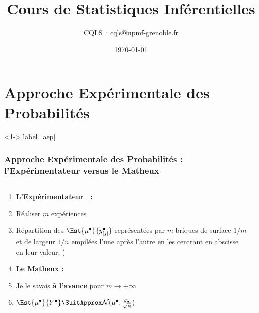 \documentclass[11pt]{beamer}
\title[Problématiques Produits A et B]
{Cours de Statistiques Inférentielles}
\author{CQLS~: cqls@upmf-grenoble.fr}
\date{\today}
\begin{document}
\maketitle


\section[A.E.P.]{Approche Expérimentale des Probabilités}

\begin{frame}<1->[label=aep]
\frametitle<1->{\textbf{A}pproche \textbf{E}xpérimentale des \textbf{P}robabilités : l'Expérimentateur versus le Matheux}
\begin{columns}
\begin{column}{5cm}
      \begin{enumerate}
     \item[] \textbf{L'Expérimentateur ~:} 
        \item<1-10| alert@1-4>
         Réaliser $m$ expériences
        \item<5-10| alert@5-8>
          Répartition des $\Est{\mu^\bullet}{y^\bullet_{[j]}}$ {\small représentées par $m$ briques de surface $1/m$ et de largeur $1/n$ empilées l'une après l'autre en les centrant en abscisse en leur valeur.}
          )
  \item<9-10>[] \textbf{Le Matheux :}      
  \item<9-10| alert@9>
          Je le savais \textbf{à l'avance} pour $m\to+\infty$
           \item<10| alert@10>
           $\Est{\mu^\bullet}{Y^\bullet}\SuitApprox \mathcal{N}(\mu^\bullet,\frac{\sigma_\bullet}{\sqrt{n}})$
      \end{enumerate}
     
\end{column}    
\begin{column}{6.5cm}








\end{column}
\end{columns}
\end{frame}
\end{document}
